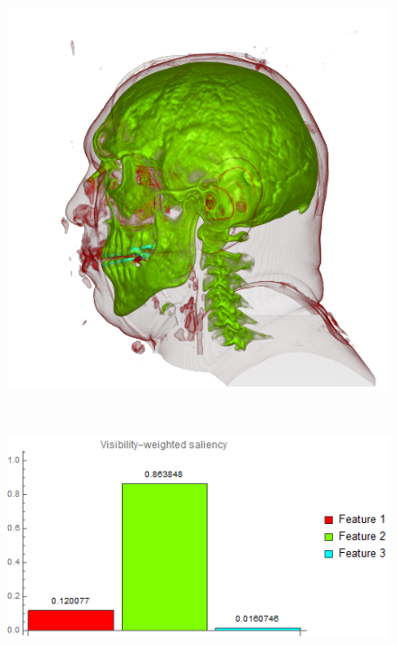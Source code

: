 \begin{figure}
\begin{minipage}{.24\textwidth}
		\includegraphics[width=1\linewidth]{images/vismale_naive_optimized_green_1000}
		\subcaption{}
	\end{minipage}~
	\begin{minipage}{.25\textwidth}
		\includegraphics[width=1\linewidth]{images/vismale_naive_optimized_green_1000_visibility_saliency_weighted_chart}
		\subcaption{}
	\end{minipage}~
	\begin{minipage}{.24\textwidth}

\end{minipage}
\end{figure}
